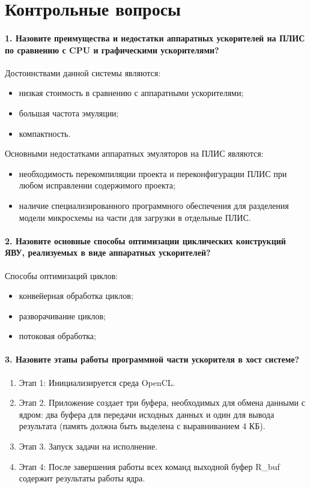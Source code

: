 \chapter*{Контрольные вопросы}

\subsubsection{1. Назовите преимущества и недостатки аппаратных ускорителей на ПЛИС по сравнению с CPU и графическими ускорителями?}
Достоинствами данной системы являются:
\begin{itemize}
	\item низкая стоимость в сравнению с аппаратными ускорителями;
	\item большая частота эмуляции;
	\item компактность.
\end{itemize}

Основными недостатками аппаратных эмуляторов на ПЛИС являются: 
\begin{itemize}
	\item необходимость перекомпиляции проекта и переконфигурации ПЛИС при любом исправлении содержимого проекта;
	\item наличие специализированного программного обеспечения для разделения модели микросхемы на части для загрузки в отдельные ПЛИС.
\end{itemize}


\subsubsection{2. Назовите основные способы оптимизации циклических конструкций ЯВУ, реализуемых в виде аппаратных ускорителей?}

Способы оптимизаций циклов:
\begin{itemize}
	\item конвейерная обработка циклов;
	\item разворачивание циклов;
	\item потоковая обработка;
\end{itemize}


\subsubsection{3. Назовите этапы работы программной части ускорителя в хост системе?}

\begin{enumerate}
	\item Этап 1: Инициализируется среда OpenCL.
	\item Этап 2. Приложение создает три буфера, необходимых для обмена данными с ядром: два буфера для передачи исходных данных и один для вывода результата (память должна быть выделена с выравниванием 4 КБ). 
	\item Этап 3. Запуск задачи на исполнение.
	\item Этап 4: После завершения работы всех команд выходной буфер R\_buf содержит результаты работы ядра. 
\end{enumerate}

